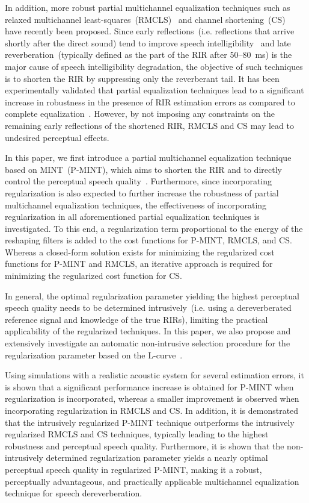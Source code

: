 \documentclass[draftcls,onecolumn,11pt]{IEEEtran}
\begin{document}
In addition, more robust partial multichannel equalization techniques such as relaxed multichannel least-squares~(RMCLS)~\cite{Zhang_IWAENC_2010} and channel shortening~(CS)~\cite{Kallinger_ICASSP_2006} have recently been proposed.
Since early reflections~(i.e. reflections that arrive shortly after the direct sound) tend to improve speech intelligibility~\cite{Arweiler_JASA_2011,Warzybok_Acusticum_2011} and late reverberation~(typically defined as the part of the RIR after $50$--$80$~ms) is the major cause of speech intelligibility degradation, the objective of such techniques is to shorten the RIR by suppressing only the reverberant tail.
It has been experimentally validated that partial equalization techniques lead to a significant increase in robustness in the presence of RIR estimation errors as compared to complete equalization~\cite{Zhang_IWAENC_2010}.
However, by not imposing any constraints on the remaining early reflections of the shortened RIR, RMCLS and CS may lead to undesired perceptual effects.

In this paper, we first introduce a partial multichannel equalization technique based on MINT~(P-MINT), which aims to shorten the RIR and to directly control the perceptual speech quality~\cite{Kodrasi_ICASSP_2012}.
Furthermore, since incorporating regularization is also expected to further increase the robustness of partial multichannel equalization techniques, the effectiveness of incorporating regularization in all aforementioned partial equalization techniques is investigated.
To this end, a regularization term proportional to the energy of the reshaping filters is added to the cost functions for P-MINT, RMCLS, and CS.
Whereas a closed-form solution exists for minimizing the regularized cost functions for P-MINT and RMCLS, an iterative approach is required for minimizing the regularized cost function for CS.

In general, the optimal regularization parameter yielding the highest perceptual speech quality needs to be determined intrusively~(i.e. using a dereverberated reference signal and knowledge of the true RIRs), limiting the practical applicability of the regularized techniques.
In this paper, we also propose and extensively investigate an automatic non-intrusive selection procedure for the regularization parameter based on the L-curve~\cite{Hansen_1993}.

Using simulations with a realistic acoustic system for several estimation errors, it is shown that a significant performance increase is obtained for P-MINT when regularization is incorporated, whereas a smaller improvement is observed when incorporating regularization in RMCLS and CS.
In addition, it is demonstrated that the intrusively regularized P-MINT technique outperforms the intrusively regularized RMCLS and CS techniques, typically leading to the highest robustness and perceptual speech quality.
Furthermore, it is shown that the non-intrusively determined regularization parameter yields a nearly optimal perceptual speech quality in regularized P-MINT, making it a robust, perceptually advantageous, and practically applicable multichannel equalization technique for speech dereverberation.
\end{document}
